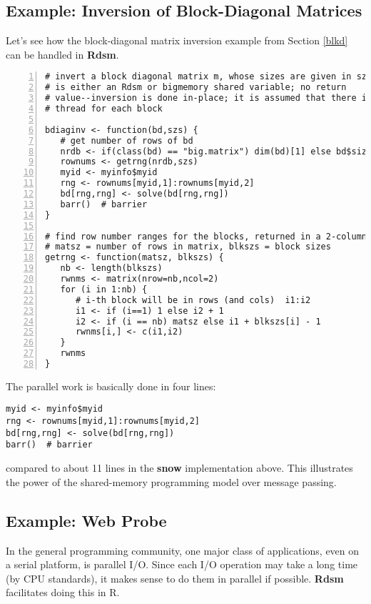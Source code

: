 \subsection{Example:  Inversion of Block-Diagonal Matrices}

Let's see how the block-diagonal matrix inversion example from Section
\ref{blkd} can be handled in {\bf Rdsm}.

\begin{lstlisting}[numbers=left]
# invert a block diagonal matrix m, whose sizes are given in szs; here m
# is either an Rdsm or bigmemory shared variable; no return
# value--inversion is done in-place; it is assumed that there is one
# thread for each block

bdiaginv <- function(bd,szs) {
   # get number of rows of bd
   nrdb <- if(class(bd) == "big.matrix") dim(bd)[1] else bd$size[1]
   rownums <- getrng(nrdb,szs)
   myid <- myinfo$myid
   rng <- rownums[myid,1]:rownums[myid,2]
   bd[rng,rng] <- solve(bd[rng,rng])
   barr()  # barrier
}

# find row number ranges for the blocks, returned in a 2-column matrix;
# matsz = number of rows in matrix, blkszs = block sizes
getrng <- function(matsz, blkszs) {
   nb <- length(blkszs)
   rwnms <- matrix(nrow=nb,ncol=2)
   for (i in 1:nb) {
      # i-th block will be in rows (and cols)  i1:i2
      i1 <- if (i==1) 1 else i2 + 1
      i2 <- if (i == nb) matsz else i1 + blkszs[i] - 1
      rwnms[i,] <- c(i1,i2)
   }
   rwnms
}
\end{lstlisting}

The parallel work is basically done in four lines:

\begin{lstlisting}
myid <- myinfo$myid
rng <- rownums[myid,1]:rownums[myid,2]
bd[rng,rng] <- solve(bd[rng,rng])
barr()  # barrier
\end{lstlisting}

compared to about 11 lines in the {\bf snow} implementation above.  This
illustrates the power of the shared-memory programming model over
message passing.

\subsection{Example:  Web Probe}

In the general programming community, one major class of applications,
even on a serial platform, is parallel I/O.  Since each I/O operation
may take a long time (by CPU standards), it makes sense to do them in
parallel if possible.  {\bf Rdsm} facilitates doing this in R.

